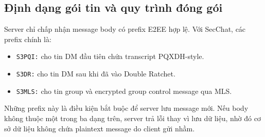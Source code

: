 \subsection{Định dạng gói tin và quy trình đóng gói}\label{subsec:body-format}

Server chỉ chấp nhận message body có prefix E2EE hợp lệ. Với SecChat, các prefix chính là:

\begin{itemize}
    \item \texttt{S3PQI:} cho tin DM đầu tiên chứa transcript PQXDH-style.
    \item \texttt{S3DR:} cho tin DM sau khi đã vào Double Ratchet.
    \item \texttt{S3MLS:} cho tin group và encrypted group control message qua MLS.
\end{itemize}

Những prefix này là điều kiện bắt buộc để server lưu message mới. Nếu body không thuộc một trong ba dạng trên, server trả lỗi thay vì lưu dữ liệu, nhờ đó cơ sở dữ liệu không chứa plaintext message do client gửi nhầm.

